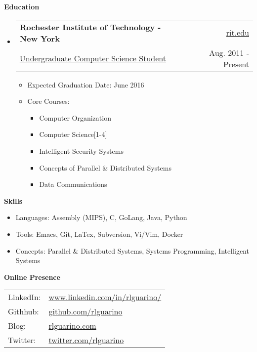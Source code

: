 \documentclass[letterpaper,11pt]{article}
\makeatletter
\newcommand{\resheading}[1]{{\large \colorbox{mygrey}{\begin{minipage}{\textwidth}{\textbf{#1 \vphantom{p\^{E}}}}\end{minipage}}}}
\newcommand{\ressubheading}[4]{
\begin{tabular*}{6.5in}{l@{\extracolsep{\fill}}r}
		\textbf{#1} & #2 \\
		{#3} & {#4} \\
\end{tabular*}\vspace{-6pt}}
\makeatother
\begin{document}
\resheading{Education}
	{ \footnotesize
	\begin{itemize}
		\item
			\ressubheading{Rochester Institute of Technology - New York}{\href{http://www.rit.edu}{rit.edu}}{\href{http://www.cs.rit.edu/}{Undergraduate Computer Science Student}}{Aug. 2011 - Present}
				{ \footnotesize
				\begin{itemize}
					\item{Expected Graduation Date: June 2016}
					\item{Core Courses:}
						\begin{itemize}
							\item{Computer Organization}
							\item{Computer Science[1-4]}
                                                        \item{Intelligent Security Systems}
							\item{Concepts of Parallel \& Distributed Systems}
							\item{Data Communications}
						\end{itemize}
				\end{itemize}
				}
	\end{itemize} %
	}



\resheading{{Skills}}
{ \footnotesize
		\begin{itemize}
			\item{Languages: Assembly (MIPS), C, GoLang, Java, Python}
			\item{Tools: Emacs, Git, LaTex, Subversion, Vi/Vim, Docker}
			\item{Concepts: Parallel \& Distributed Systems, Systems Programming, Intelligent Systems}
		\end{itemize}
}

\resheading{Online Presence}
{
	\begin{tabularx}{2in}{XX}
		LinkedIn: & \href{http://www.linkedin.com/in/rlguarino/}{www.linkedin.com/in/rlguarino/} \\
		Githhub: & \href{http://www.github.com/rlguarino}{github.com/rlguarino} \\
		Blog: & \href{http://www.rlguarino.com/}{rlguarino.com} \\
		Twitter: & \href{https://twitter.com/rlguarino}{twitter.com/rlguarino} \\
	\end{tabularx}
}
\pagebreak

\end{document}
